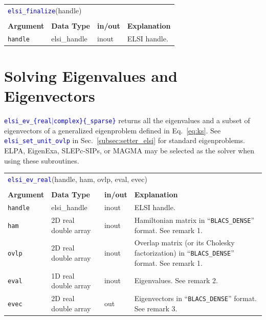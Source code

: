 \documentclass{report}
\newcommand{\api}[1]{\textcolor{blue}{\texttt{#1}}}
\begin{document}
\begin{tabular}[]{|p{20mm}|p{20mm}|p{10mm}|p{112mm}|}
\multicolumn{4}{l}{\api{elsi\_finalize}(handle)}\\
\multicolumn{4}{l}{}\\
\hline
\multicolumn{1}{|l|}{\textbf{Argument}} & \multicolumn{1}{l|}{\textbf{Data Type}} & \multicolumn{1}{l|}{\textbf{in/out}} & \multicolumn{1}{l|}{\textbf{Explanation}}\\
\hline
\texttt{handle} & elsi\_handle & inout & ELSI handle.\\
\hline
\end{tabular}

\section{Solving Eigenvalues and Eigenvectors}
\label{sec:ev}
\api{elsi\_ev\_\{real$\vert$complex\}\{\_sparse\}} returns all the eigenvalues and a subset of eigenvectors of a generalized eigenproblem defined in Eq.~\ref{eq:ks}. See \api{elsi\_set\_unit\_ovlp} in Sec.~\ref{subsec:setter_elsi} for standard eigenproblems. ELPA, EigenExa, SLEPc-SIPs, or MAGMA may be selected as the solver when using these subroutines.

\begin{tabular}[]{|p{20mm}|p{40mm}|p{10mm}|p{92mm}|}
\multicolumn{4}{l}{\api{elsi\_ev\_real}(handle, ham, ovlp, eval, evec)}\\
\multicolumn{4}{l}{}\\
\hline
\multicolumn{1}{|l|}{\textbf{Argument}} & \multicolumn{1}{l|}{\textbf{Data Type}} & \multicolumn{1}{l|}{\textbf{in/out}} & \multicolumn{1}{l|}{\textbf{Explanation}}\\
\hline
\texttt{handle} & elsi\_handle         & inout & ELSI handle.\\
\hline
\texttt{ham}    & 2D real double array & inout & Hamiltonian matrix in ``\texttt{BLACS\_DENSE}'' format. See remark 1.\\
\hline
\texttt{ovlp}   & 2D real double array & inout & Overlap matrix (or its Cholesky factorization) in ``\texttt{BLACS\_DENSE}'' format. See remark 1.\\
\hline
\texttt{eval}   & 1D real double array & inout & Eigenvalues. See remark 2.\\
\hline
\texttt{evec}   & 2D real double array & out   & Eigenvectors in ``\texttt{BLACS\_DENSE}'' format. See remark 3.\\
\hline
\end{tabular}
\end{document}
